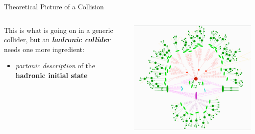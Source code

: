 \documentclass[9pt]{beamer}
\begin{document}
\begin{frame}{Theoretical Picture of a Collision}
\begin{columns}
\begin{column}{0.5\textwidth}
            \vspace*{20pt}
            This is what is going on in a generic collider, but an
            \textit{\textbf{hadronic collider}} needs one more ingredient:
            \begin{itemize}
                \item \textit{partonic description} of the
                    \alert{\textbf{hadronic initial state}}
            \end{itemize}
        \end{column}
        \begin{column}{0.5\textwidth}
            \begin{tcolorbox}[size=tight,sharpish corners,boxrule=0mm]
                \includegraphics[width=\textwidth]{proton-to-detector}
            \end{tcolorbox}
        \end{column}
    \end{columns}
\end{frame}
\end{document}
